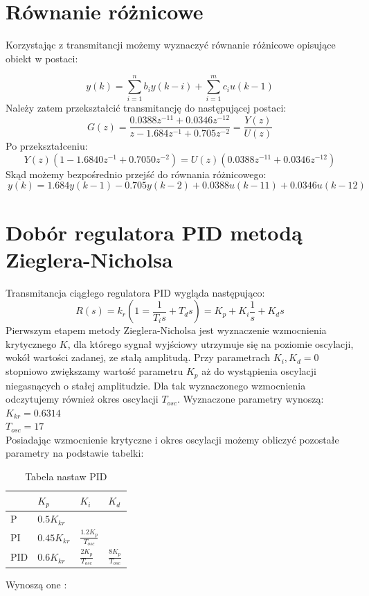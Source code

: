 \documentclass[a4paper, 11pt]{article}
\begin{document}
\section{Równanie różnicowe}
Korzystając z transmitancji możemy wyznaczyć równanie różnicowe opisujące obiekt w postaci: 

$$y(k) = \sum_{i=1}^{n} b_iy(k-i)+ \sum_{i=1}^{m} c_iu(k-1)$$
Należy zatem przekształcić transmitancję do następującej postaci: 
$$G(z) = \frac{0.0388z^{-11}+0.0346z^{-12}}{z-1.684z^{-1}+0.705z^{-2}} = \frac{Y(z)}{U(z)}$$
Po przekształceniu: 
$$Y(z)(1-1.6840z^{-1}+0.7050z^{-2}) = U(z)(0.0388z^{-11}+0.0346z^{-12})$$
Skąd możemy bezpośrednio przejść do równania różnicowego: 
\begin{equation}\
\label{rozn}
y(k) = 1.684y(k-1) - 0.705y(k-2) + 0.0388u(k-11) + 0.0346u(k-12)
\end{equation}


\section{Dobór regulatora PID metodą Zieglera-Nicholsa}
Transmitancja ciągłego regulatora PID wygląda następująco: 
$$R(s) = k_r(1=\frac{1}{T_is}+T_ds)=K_p + K_i\frac{1}{s}+K_ds$$
Pierwszym etapem metody Zieglera-Nicholsa jest wyznaczenie wzmocnienia krytycznego $K$, dla którego sygnał wyjściowy utrzymuje się na poziomie oscylacji, wokół wartości zadanej, ze stałą amplitudą. Przy parametrach $K_i, K_d=0$ stopniowo zwiększamy wartość parametru $K_p$ aż do wystąpienia oscylacji niegasnących o stałej amplitudzie. Dla tak wyznaczonego wzmocnienia odczytujemy również okres oscylacji $T_{osc}$. Wyznaczone parametry wynoszą: \\

$K_{kr} = 0.6314$\\
\indent $T_{osc} = 17$\\

Posiadając wzmocnienie krytyczne i okres oscylacji możemy obliczyć pozostałe parametry na podstawie tabelki: 
\begin{table}[htp]
\centering
\caption{Tabela nastaw PID}
\begin{tabular}{|l|l|l|l|}
\hline
    & $K_p$       & $K_i $                & $K_d $              \\
\hline
P   & $0.5K_{kr} $ &                    &                   \\
\hline
PI   & $0.45K_{kr}$ & $\frac{1.2K_p}{T_{osc}}$ &                   \\
\hline
PID & $0.6K_{kr} $ & $\frac{2K_p}{T_{osc}}$   & $\frac{8K_p}{T_{osc}}$ \\
\hline
\end{tabular}
\end{table}
Wynoszą one :\\
\end{document}
